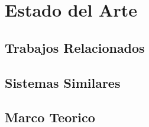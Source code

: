 
\chapter{Estado del Arte}
\label{capitulo2}

\section{Trabajos Relacionados}

\section{Sistemas Similares}

\section{Marco Teorico}

